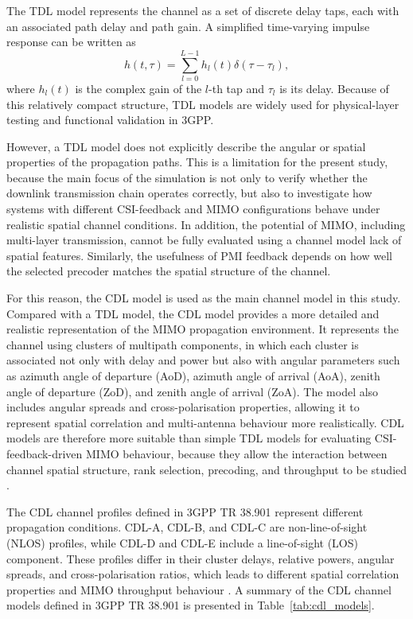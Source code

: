 \documentclass[a4paper,12pt,onecolumn]{article}
\begin{document}
		The TDL model represents the channel as a set of discrete delay taps, each with an associated path delay and path gain. A simplified time-varying impulse response can be written as
		\[
		h(t,\tau) = \sum_{l=0}^{L-1} h_l(t)\delta(\tau-\tau_l),
		\]
		where \(h_l(t)\) is the complex gain of the \(l\)-th tap and \(\tau_l\) is its delay. Because of this relatively compact structure, TDL models are widely used for physical-layer testing and functional validation in 3GPP. 
			
		However, a TDL model does not explicitly describe the angular or spatial properties of the propagation paths. This is a limitation for the present study, because the main focus of the simulation is not only to verify whether the downlink transmission chain operates correctly, but also to investigate how systems with different CSI-feedback and MIMO configurations behave under realistic spatial channel conditions. In addition, the potential of MIMO, including multi-layer transmission, cannot be fully evaluated using a channel model lack of spatial features. Similarly, the usefulness of PMI feedback depends on how well the selected precoder matches the spatial structure of the channel.
		
		For this reason, the CDL model is used as the main channel model in this study. Compared with a TDL model, the CDL model provides a more detailed and realistic representation of the MIMO propagation environment. It represents the channel using clusters of multipath components, in which each cluster is associated not only with delay and power but also with angular parameters such as azimuth angle of departure (AoD), azimuth angle of arrival (AoA), zenith angle of departure (ZoD), and zenith angle of arrival (ZoA). The model also includes angular spreads and cross-polarisation properties, allowing it to represent spatial correlation and multi-antenna behaviour more realistically. CDL models are therefore more suitable than simple TDL models for evaluating CSI-feedback-driven MIMO behaviour, because they allow the interaction between channel spatial structure, rank selection, precoding, and throughput to be studied \cite{3GPP2026}.
			
		The CDL channel profiles defined in 3GPP TR 38.901 represent different propagation conditions. CDL-A, CDL-B, and CDL-C are non-line-of-sight (NLOS) profiles, while CDL-D and CDL-E include a line-of-sight (LOS) component. These profiles differ in their cluster delays, relative powers, angular spreads, and cross-polarisation ratios, which leads to different spatial correlation properties and MIMO throughput behaviour \cite{3GPP2026}. A summary of the CDL channel models defined in 3GPP TR 38.901 is presented in Table~\ref{tab:cdl_models}. 
				
\end{document}
